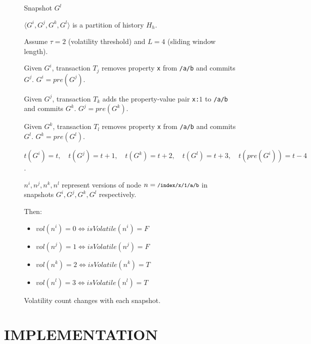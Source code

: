 \documentclass[abstracton,12pt]{scrreprt}
\begin{document}
\begin{figure}[h]
\begin{scriptsize}
\begin{multicols}{4}
\begin{center}
{                    \vspace{27mm}
                }

                Snapshot $G^l$
            \end{center}
        \end{multicols}
    \end{scriptsize}
    $\langle G^i,G^j,G^k,G^l \rangle$ is a partition of history $H_h$.

    Assume $\tau = 2$ (volatility threshold) and $L = 4$ (sliding window length).
    
    Given $G^i$, transaction $T_j$ removes property \texttt{x} from \texttt{/a/b} and commits $G^j$. $G^i = pre(G^j)$.
    
    Given $G^j$, transaction $T_k$ adds the property-value pair \texttt{x:}$1$ to \texttt{/a/b} and commits $G^k$. $G^j = pre(G^k)$.
    
    Given $G^k$, transaction $T_l$ removes property \texttt{x} from \texttt{/a/b} and commits $G^l$. $G^k = pre(G^l)$.

    $t(G^i) = t, \quad t(G^j) = t + 1, \quad t(G^k) = t + 2, \quad t(G^l) = t + 3, \quad t(pre(G^i)) = t - 4$.
    
    $n^i, n^j, n^k, n^l$ represent versions of node $n = \texttt{\footnotesize /index/x/1/a/b}$ in snapshots $G^i, G^j, G^k, G^l$ respectively.
    
    Then:
    \begin{itemize}
        \item $vol(n^i) = 0 \iff isVolatile(n^i) = F$
        \item $vol(n^j) = 1 \iff isVolatile(n^j) = F$
        \item $vol(n^k) = 2 \iff isVolatile(n^k) = T$
        \item $vol(n^l) = 3 \iff isVolatile(n^l) = T$
    \end{itemize}    
    \caption{Volatility count changes with each snapshot.}
    \label{fig:vol_example}
\end{figure}

\chapter{IMPLEMENTATION}
\end{document}
